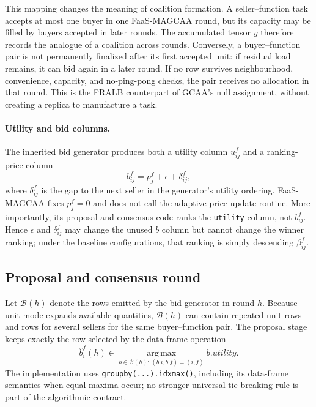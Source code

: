 This mapping changes the meaning of coalition formation. A seller--function
task accepts at most one buyer in one FaaS-MAGCAA round, but its capacity may
be filled by buyers accepted in later rounds. The accumulated tensor $y$
therefore records the analogue of a coalition across rounds. Conversely, a
buyer--function pair is not permanently finalized after its first accepted
unit: if residual load remains, it can bid again in a later round. If no row
survives neighbourhood, convenience, capacity, and no-ping-pong checks, the
pair receives no allocation in that round. This is the FRALB counterpart of
GCAA's null assignment, without creating a replica to manufacture a task.

\paragraph{Utility and bid columns.}
The inherited bid generator produces both a utility column
$u_{ij}^f$ and a ranking-price column
\begin{equation}
  b_{ij}^f=p_j^f+\epsilon+\delta_{ij}^f,
  \label{eq:magcaa-b-column}
\end{equation}
where $\delta_{ij}^f$ is the gap to the next seller in the generator's
utility ordering. FaaS-MAGCAA fixes $p_j^f=0$ and does not call the adaptive
price-update routine. More importantly, its proposal and consensus code
ranks the \texttt{utility} column, not $b_{ij}^f$. Hence $\epsilon$ and
$\delta_{ij}^f$ may change the unused $b$ column but cannot change the
winner ranking; under the baseline configurations, that ranking is simply
descending $\beta_{ij}^f$.

\subsection{Proposal and consensus round}
\label{sec:magcaa-consensus}

Let $\mathcal B(h)$ denote the rows emitted by the bid generator in round
$h$. Because unit mode expands available quantities, $\mathcal B(h)$ can
contain repeated unit rows and rows for several sellers for the same
buyer--function pair. The proposal stage keeps exactly the row selected by
the data-frame operation
\begin{equation}
  \widehat b_i^f(h)\in
  \underset{b\in\mathcal B(h):\,(b.i,b.f)=(i,f)}{\operatorname{arg\,max}}
  b.\textit{utility}.
  \label{eq:magcaa-proposal}
\end{equation}
The implementation uses \texttt{groupby(...).idxmax()}, including its
data-frame semantics when equal maxima occur; no stronger universal
tie-breaking rule is part of the algorithmic contract.

